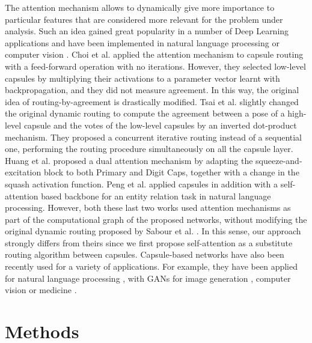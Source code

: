 \documentclass{article}
\begin{document}
The attention mechanism allows to dynamically give more importance to particular features that are considered more relevant for the problem under analysis. Such an idea gained great popularity in a number of Deep Learning applications and have been implemented in natural language processing  \cite{bahdanau2014neural,vaswani2017attention} or computer vision  \cite{jaderberg2015spatial,xu2015show,hu2018squeeze,woo2018cbam, salvetti2020multi}. Choi et al. \cite{choi2019attention} applied the attention mechanism to capsule routing with a feed-forward operation with no iterations. However, they selected low-level capsules by multiplying their activations to a parameter vector learnt with backpropagation, and they did not measure agreement. In this way, the original idea of routing-by-agreement is drastically modified. Tsai et al. \cite{tsai2020capsules} slightly changed the original dynamic routing to compute the agreement between a pose of a high-level capsule and the votes of the low-level capsules by an inverted dot-product mechanism. They proposed a concurrent iterative routing instead of a sequential one, performing the routing procedure simultaneously on all the capsule layer. Huang et al. \cite{huang2020capsnet} proposed a dual attention mechanism by adapting the squeeze-and-excitation block \cite{hu2018squeeze} to both Primary and Digit Caps, together with a change in the squash activation function. Peng et al. \cite{peng2020bg} applied capsules in addition with a self-attention based backbone for an entity relation task in natural language processing. However, both these last two works used attention mechanisms as part of the computational graph of the proposed networks, without modifying the original dynamic routing proposed by Sabour et al. \cite{sabour2017dynamic}. In this sense, our approach strongly differs from theirs since we first propose self-attention as a substitute routing algorithm between capsules. Capsule-based networks have also been recently used for a variety of applications. For example, they have been applied for natural language processing \cite{peng2020bg,mcintosh2018multi,zhang2018attention,du2019novel}, with GANs for image generation \cite{jaiswal2018capsulegan}, computer vision \cite{duarte2018videocapsulenet,lalonde2018capsules,nguyen2019capsule} or medicine \cite{mobiny2019automated,kruthika2019cbir}.

\section{Methods}
\end{document}
